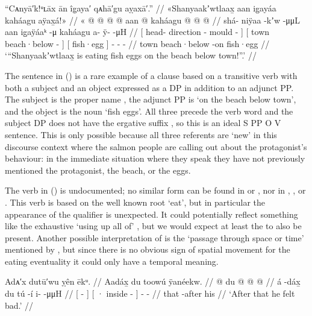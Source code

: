 \ex\label{ex:100-51-shanyaakwtlaaxh-eating}%
%
\begingl
	\glpreamble	“Cᴀnyā′k!ᵘʟāx ān îg̣aya′ qᴀhā′gu aỵaxā′.” //
	\glpreamble	«\!Shanyaakʼwtlaax̱ aan ig̱ayáa kaháagu aÿax̱á!\!» //
	\gla	{} «\! @ {} @ {} @ {} @ {} {} 
		{} aan  @ {} {}
		{} kaháagu {}
		 @ {} @ {} @ {} //
	\glb	{} \pqp{}shá- niÿaa -kʼw \· -μμL {}
		{} aan ig̱aÿáaᵏ -μ {}
		{} kaháagu {}
		a- ÿ-  -μH //
	\glc	{}[ \pqp{}head- direction - \·mould - {}]
		{}[ town beach·below - {}]
		{}[ fish·egg {}]
		- -  - //
	\gld	{} \pqp{} {} {} {} {} {}
		{} town beach·below -on {}
		{} fish·egg {}
		 {} {} {} //
	\glft	‘“Shanyaakʼwtlaax̱ is eating fish eggs on the beach below town!”.’
		//
\endgl
\xe

The sentence in (\lastx) is a rare example of a clause based on a transitive verb with both a subject and an object expressed as a DP in addition to an adjunct PP.
The subject is the proper name , the adjunct PP is  ‘on the beach below town’, and the object is the noun  ‘fish eggs’.
All three precede the verb word and the subject DP does not have the ergative suffix , so this is an ideal S PP O V sentence.
This is only possible because all three referents are ‘new’ in this discourse context where the salmon people are calling out about the protagonist’s behaviour: in the immediate situation where they speak they have not previously mentioned the protagonist, the beach, or the eggs.

The verb  in (\lastx) is undocumented; no similar form can be found in \cite{leer:1973} or \cite{leer:1976}, nor in \cite{story-naish:1973}, \cite{edwards:2009}, or \cite{eggleston:2017}.
This verb is based on the well known root  ‘eat’, but in particular the appearance of the  qualifier is unexpected.
It could potentially reflect something like the exhaustive  ‘using up all of’ \parencite[219]{leer:1991}, but we would expect at least the  to also be present.
Another possible interpretation of  is the ‘passage through space or time’ mentioned by \textcite[80]{story:1966}, but since there is no obvious sign of spatial movement for the eating eventuality it could only have a temporal meaning.

\ex\label{ex:100-52-shanyaakwtlaaxh-eating}%
%
\begingl
	\glpreamble	Adᴀ′x dutū′wu ỵên ēkᵘ. //
	\glpreamble	Aadáx̱ du toowú ÿanéekw. //
	\gla	{}  @ {} {}
		{} du  @ {} {}
		 @ {} @ {} //
	\glb	{} á -dáx̱ {}
		{} du tú -í {}
		i-  -μμH //
	\glc	{}[  - {}]
		{}[ · inside - {}]
		-  - //
	\gld	{} that -after {} 
		{} his  {} {} 
		 {} {} //
	\glft	‘After that he felt bad.’
		//
\endgl
\xe

